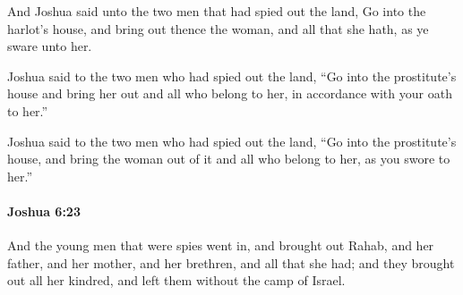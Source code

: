 			\begin{versebox}
					\item[BHS] 
					\item[ASV] And Joshua said unto the two men that had spied out the land, Go into the harlot's house, and bring out thence the woman, and all that she hath, as ye sware unto her.
					\item[NIV] Joshua said to the two men who had spied out the land, “Go into the prostitute’s house and bring her out and all who belong to her, in accordance with your oath to her.”
					\item[NRSV] Joshua said to the two men who had spied out the land, “Go into the prostitute’s house, and bring the woman out of it and all who belong to her, as you swore to her.”
			\end{versebox}

		\paragraph{Joshua 6:23} %
			\label{JOSHUA-6-23}

			And the young men that were spies went in, and brought out Rahab, and her father, and her mother, and her brethren, and all that she had; and they brought out all her kindred, and left them without the camp of Israel.

